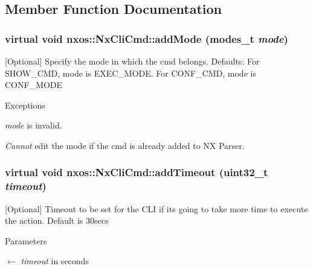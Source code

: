 \subsection{Member Function Documentation}
\hypertarget{classnxos_1_1NxCliCmd_a38260da2d6b7a227c4dd027521205c0b}{
\subsubsection[{addMode}]{\setlength{\rightskip}{0pt plus 5cm}virtual void nxos::NxCliCmd::addMode ({\bf modes\_\-t} {\em mode})}}
\label{classnxos_1_1NxCliCmd_a38260da2d6b7a227c4dd027521205c0b}
\mbox{[}Optional\mbox{]} Specify the mode in which the cmd belongs. Defaults: For SHOW\_\-CMD, mode is EXEC\_\-MODE. For CONF\_\-CMD, mode is CONF\_\-MODE 
\begin{DoxyExceptions}{Exceptions}
\item[{\em mode}]is invalid. \item[{\em Cannot}]edit the mode if the cmd is already added to NX Parser. \end{DoxyExceptions}
\hypertarget{classnxos_1_1NxCliCmd_ad4ebfd3ce0e68266bbc22bb4bc7dad0b}{
\subsubsection[{addTimeout}]{\setlength{\rightskip}{0pt plus 5cm}virtual void nxos::NxCliCmd::addTimeout (uint32\_\-t {\em timeout})}}
\label{classnxos_1_1NxCliCmd_ad4ebfd3ce0e68266bbc22bb4bc7dad0b}
\mbox{[}Optional\mbox{]} Timeout to be set for the CLI if its going to take more time to execute the action. Default is 30secs 
\begin{DoxyParams}{Parameters}
\item[\mbox{$\leftarrow$} {\em timeout}]in seconds\end{DoxyParams}

